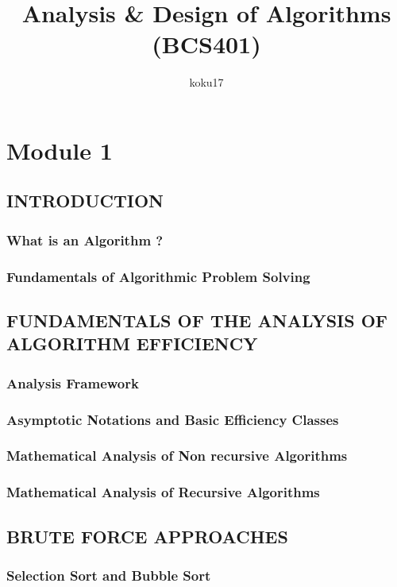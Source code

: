 \documentclass{article}
\author{koku17}
\title{Analysis \& Design of Algorithms (BCS401)}
\begin{document}
	\maketitle \thispagestyle{empty} \newpage
	\tableofcontents \thispagestyle{empty} \newpage \setcounter{page}{1}
	\section{Module 1}
	\subsection{INTRODUCTION}
	\subsubsection{What is an Algorithm ?}
	\subsubsection{Fundamentals of Algorithmic Problem Solving}

	\subsection{FUNDAMENTALS OF THE ANALYSIS OF ALGORITHM EFFICIENCY}
	\subsubsection{Analysis Framework}
	\subsubsection{Asymptotic Notations and Basic Efficiency Classes}
	\subsubsection{Mathematical Analysis of Non recursive Algorithms}
	\subsubsection{Mathematical Analysis of Recursive Algorithms}

	\subsection{BRUTE FORCE APPROACHES}
	\subsubsection{Selection Sort and Bubble Sort}
\end{document}
